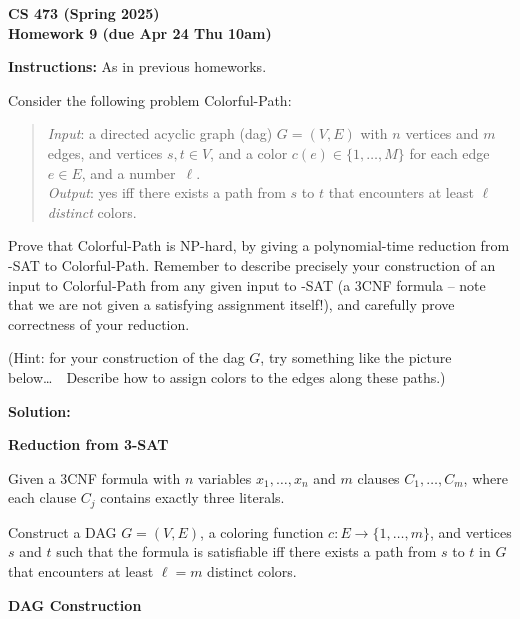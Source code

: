 \documentclass[11pt]{article}
\begin{document}
\begin{center}\Large\bf 
CS 473 (Spring 2025)\\
Homework 9 (due Apr 24 Thu 10am)
\end{center}

\medskip\noindent
{\bf Instructions:} As in previous homeworks.

\begin{description}

\bigskip
\item[Problem 9.1:]
Consider the following problem {\sc Colorful-Path}:
\begin{quote}
\emph{Input}: a directed acyclic graph (dag) $G=(V,E)$ with $n$ vertices and $m$ edges, and
vertices $s,t\in V$,
and a color $c(e)\in \{1,\ldots,M\}$ for each edge $e\in E$, and a number~$\ell$.\\[2pt]
\emph{Output}: yes iff there exists a path from $s$ to $t$ that encounters at least $\ell$
\emph{distinct} colors.
\end{quote}

Prove that {\sc Colorful-Path} is NP-hard, by giving a polynomial-time reduction from
{-SAT} to {\sc Colorful-Path}.  Remember to describe precisely your construction
of an input to {\sc Colorful-Path} from any given input to {-SAT} (a 3CNF formula -- note that we are not given a satisfying assignment itself\@!), and carefully prove correctness of your reduction.

(Hint: for your construction of the dag $G$, try something like the picture below\ldots\ \ Describe how to assign colors to the edges along these paths.)

\newpage
\textbf{Solution:}

\textbf{Reduction from 3-SAT}

Given a 3CNF formula with $n$ variables $x_1, \dots, x_n$ and $m$ clauses $C_1, \dots, C_m$, where each clause $C_j$ contains exactly three literals.

Construct a DAG $G = (V, E)$, a coloring function $c: E \to \{1, \dots, m\}$, and vertices $s$ and $t$ such that the formula is satisfiable iff there exists a path from $s$ to $t$ in $G$ that encounters at least $\ell = m$ distinct colors.

\textbf{DAG Construction}


\end{description}
\end{document}
